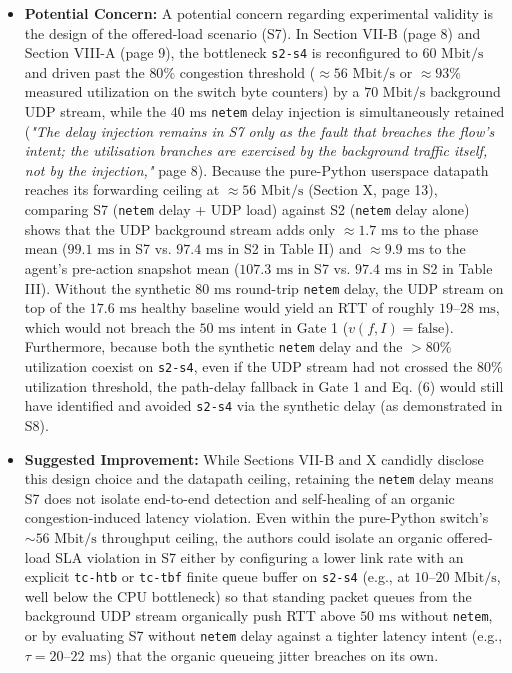 \documentclass[11pt,a4paper]{article}
\begin{document}
\begin{enumerate}[leftmargin=1.6em,itemsep=3pt]
\begin{itemize}[leftmargin=1.8em,itemsep=2pt]
\item \textbf{Potential Concern:} A potential concern regarding experimental validity is the design of the offered-load scenario (S7). In Section VII-B (page 8) and Section VIII-A (page 9), the bottleneck \texttt{s2-s4} is reconfigured to $60\text{ Mbit/s}$ and driven past the $80\%$ congestion threshold ($\approx 56\text{ Mbit/s}$ or $\approx 93\%$ measured utilization on the switch byte counters) by a $70\text{ Mbit/s}$ background UDP stream, while the $40\text{ ms}$ \texttt{netem} delay injection is simultaneously retained (\emph{"The delay injection remains in S7 only as the fault that breaches the flow's intent; the utilisation branches are exercised by the background traffic itself, not by the injection,"} page 8). Because the pure-Python userspace datapath reaches its forwarding ceiling at $\approx 56\text{ Mbit/s}$ (Section X, page 13), comparing S7 (\texttt{netem} delay + UDP load) against S2 (\texttt{netem} delay alone) shows that the UDP background stream adds only $\approx 1.7\text{ ms}$ to the phase mean ($99.1\text{ ms}$ in S7 vs. $97.4\text{ ms}$ in S2 in Table II) and $\approx 9.9\text{ ms}$ to the agent's pre-action snapshot mean ($107.3\text{ ms}$ in S7 vs. $97.4\text{ ms}$ in S2 in Table III). Without the synthetic $80\text{ ms}$ round-trip \texttt{netem} delay, the UDP stream on top of the $17.6\text{ ms}$ healthy baseline would yield an RTT of roughly $19\text{--}28\text{ ms}$, which would not breach the $50\text{ ms}$ intent in Gate 1 ($v(f, I) = \text{false}$). Furthermore, because both the synthetic \texttt{netem} delay and the $>80\%$ utilization coexist on \texttt{s2-s4}, even if the UDP stream had not crossed the $80\%$ utilization threshold, the path-delay fallback in Gate 1 and Eq. (6) would still have identified and avoided \texttt{s2-s4} via the synthetic delay (as demonstrated in S8).
\item \textbf{Suggested Improvement:} While Sections VII-B and X candidly disclose this design choice and the datapath ceiling, retaining the \texttt{netem} delay means S7 does not isolate end-to-end detection and self-healing of an organic congestion-induced latency violation. Even within the pure-Python switch's $\sim 56\text{ Mbit/s}$ throughput ceiling, the authors could isolate an organic offered-load SLA violation in S7 either by configuring a lower link rate with an explicit \texttt{tc-htb} or \texttt{tc-tbf} finite queue buffer on \texttt{s2-s4} (e.g., at $10\text{--}20\text{ Mbit/s}$, well below the CPU bottleneck) so that standing packet queues from the background UDP stream organically push RTT above $50\text{ ms}$ without \texttt{netem}, or by evaluating S7 without \texttt{netem} delay against a tighter latency intent (e.g., $\tau = 20\text{--}22\text{ ms}$) that the organic queueing jitter breaches on its own.
\end{itemize}
\end{enumerate}
\end{document}
